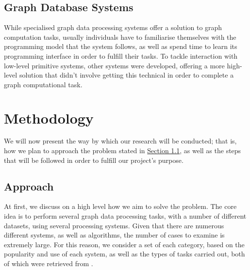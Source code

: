 \documentclass[a4paper,11pt]{article}
\begin{document}
\subsection{Graph Database Systems}

While specialised graph data processing systems offer a solution to graph computation tasks, usually individuals have to familiarise themselves with the programming model that the system follows, as well as spend time to learn its programming interface in order to fulfill their tasks. To tackle interaction with low-level primitive systems, other systems were developed, offering a more high-level solution that didn't involve getting this technical in order to complete a graph computational task. 





\section{Methodology} \label{methodology}

\par We will now present the way by which our research will be conducted; that is, how we plan to approach the problem stated in \hyperref[problem-statement]{Section 1.1}, as well as the steps that will be followed in order to fulfill our project's purpose.

\subsection{Approach} \label{approach}

\par At first, we discuss on a high level how we aim to solve the problem. The core idea is to perform several graph data processing tasks, with a number of different datasets, using several processing systems. Given that there are numerous different systems, as well as algorithms, the number of cases to examine is extremely large. For this reason, we consider a set of each category, based on the popularity and use of each system, as well as the types of tasks carried out, both of which were retrieved from \cite{survey}.
\end{document}
